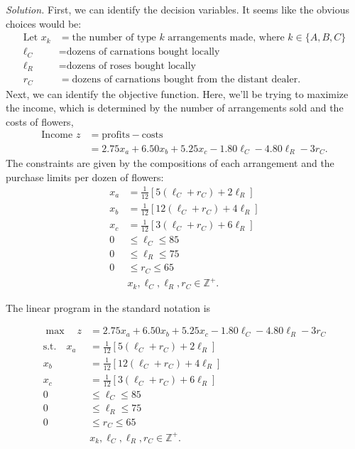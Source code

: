 \documentclass{homework}
\newcommand{\st}{\mathrm{s.t.}}
\begin{document}
\begin{enumerate}
		\textit{Solution.} \quad First, we can identify the decision variables. It seems like the obvious choices would be: \begin{align*}
			\text{Let } x_k & = \text{the number of type $k$ arrangements made, where } k \in \{A, B, C\} \\
				\ell_C & = \text{dozens of carnations bought locally} \\
				\ell_R & = \text{dozens of roses bought locally} \\
				r_C & = \text{dozens of carnations bought from the distant dealer}.
		\end{align*}
		Next, we can identify the objective function. Here, we'll be trying to maximize the income, which is determined by the number of arrangements sold and the costs of flowers,
		\begin{align*}
			\text{Income } z & = \text{profits} - \text{costs} \\
				& = 2.75 x_a + 6.50 x_b + 5.25 x_c - 1.80 \ell_C - 4.80 \ell_R - 3 r_C.
		\end{align*}
		The constraints are given by the compositions of each arrangement and the purchase limits per dozen of flowers: \begin{align*}
			x_a & = \frac{1}{12} \left[5\left(\ell_C + r_C\right) + 2 \ell_R  \right] \\
			x_b & = \frac{1}{12} \left[12\left(\ell_C + r_C\right) + 4 \ell_R  \right] \\
			x_c & = \frac{1}{12} \left[3\left(\ell_C + r_C\right) + 6 \ell_R  \right] \\
			0 & \le \ell_C \le 85 \\
			0 & \le  \ell_R  \le 75 \\
			0 & \le r_C  \le 65 \\
			& x_k, \ell_C, \ell_R, r_C  \in \mathbb{Z}^+.
		\end{align*}
	
		\pagebreak
		
		The linear program in the standard notation is 
		
		\begin{tcolorbox}
			\vspace{-1em}
			\begin{align*}
				\max\quad  z & = 2.75 x_a + 6.50 x_b + 5.25 x_c - 1.80 \ell_C - 4.80 \ell_R - 3 r_C \\
				\st \quad	x_a  & = \frac{1}{12} \left[5\left(\ell_C + r_C\right) + 2 \ell_R  \right] \\
				x_b & = \frac{1}{12} \left[12\left(\ell_C + r_C\right) + 4 \ell_R  \right] \\
				x_c & = \frac{1}{12} \left[3\left(\ell_C + r_C\right) + 6 \ell_R  \right] \\
				0 & \le \ell_C \le 85 \\
				0 & \le  \ell_R  \le 75 \\
				0 & \le r_C  \le 65 \\
				& x_k, \ell_C, \ell_R, r_C  \in \mathbb{Z}^+.
			\end{align*}
		\end{tcolorbox}
	

\end{enumerate}
\end{document}
